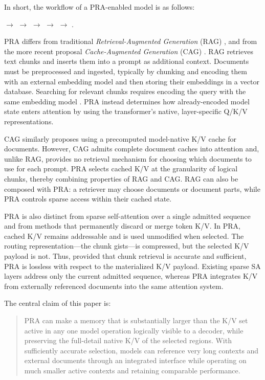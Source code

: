 \documentclass[11pt]{article}
\begin{document}
In short, the workflow of a PRA-enabled model is as follows:

\begin{center}
$\rightarrow$  $\rightarrow$ 
$\rightarrow$  $\rightarrow$ 
$\rightarrow$ .
\end{center}


PRA differs from traditional \emph{Retrieval-Augmented Generation} (RAG)
\cite{gao2023ragsurvey}, and from the more recent proposal
\emph{Cache-Augmented Generation} (CAG) \cite{chan2024cag}.
RAG retrieves text chunks and inserts them into a prompt as additional context.
Documents must be preprocessed and ingested, typically by chunking and encoding them with
an external embedding model and then storing their embeddings in a vector database.
Searching for relevant chunks requires encoding the query with the same embedding model
\cite{lewis2020rag,guu2020realm,borgeaud2022retro}. PRA instead determines how
already-encoded model state enters attention by using the transformer's native,
layer-specific Q/K/V representations.

CAG similarly proposes using a precomputed model-native K/V cache for documents. However,
CAG admits complete document caches into attention and, unlike RAG, provides no retrieval
mechanism for choosing which documents to use for each prompt. PRA selects cached K/V at
the granularity of logical chunks, thereby combining properties of RAG and CAG. RAG can
also be composed with PRA: a retriever may choose documents or document parts, while PRA
controls sparse access within their cached state.

PRA is also distinct from sparse self-attention over a single admitted sequence and from
methods that permanently discard or merge token K/V. In PRA, cached K/V remains
addressable and is used unmodified when selected. The routing representation---the chunk
gists---is compressed, but the selected K/V payload is not. Thus, provided that chunk
retrieval is accurate and sufficient, PRA is lossless with respect to the materialized
K/V payload. Existing sparse SA layers address only the current admitted sequence,
whereas PRA integrates K/V from externally referenced documents into the same attention
system.

The central claim of this paper is:

\begin{quote}
PRA can make a memory that is substantially larger than the K/V set active in any one
model operation logically visible to a decoder, while preserving the full-detail native
K/V of the selected regions. With sufficiently accurate selection, models can reference very
long contexts and external documents through an integrated interface while operating on
much smaller active contexts and retaining comparable performance.
\end{quote}
\end{document}
